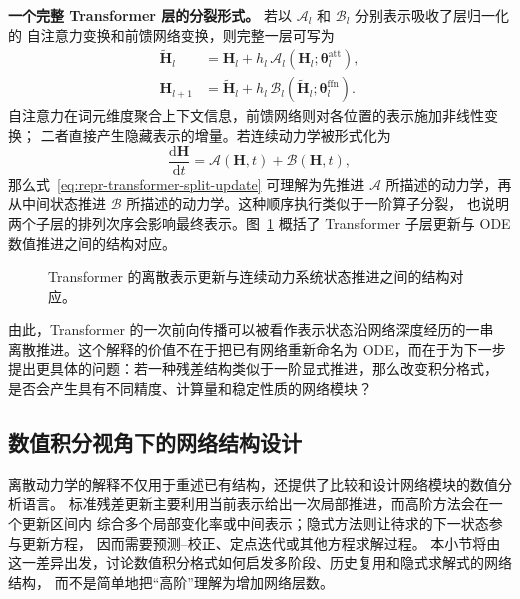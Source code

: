 \documentclass[UTF8,a4paper,zihao=-4,oneside,openany]{ctexbook}
\makeatletter
\newcommand{\AMLFigure}[2][0.96\linewidth]{%
  \begingroup
  \let\AtBeginDocument\@gobble
  \endgroup
}
\makeatother
\begin{document}
\textbf{一个完整 Transformer 层的分裂形式。}
若以 \(\mathcal{A}_l\) 和 \(\mathcal{B}_l\) 分别表示吸收了层归一化的
自注意力变换和前馈网络变换，则完整一层可写为
\begin{align}
    \widetilde{\boldsymbol{H}}_l
    &=
    \boldsymbol{H}_l
    +
    h_l\,
    \mathcal{A}_l(
        \boldsymbol{H}_l;
        \boldsymbol{\theta}^{\mathrm{att}}_l
    ),
    \nonumber\\
    \boldsymbol{H}_{l+1}
    &=
    \widetilde{\boldsymbol{H}}_l
    +
    h_l\,
    \mathcal{B}_l(
        \widetilde{\boldsymbol{H}}_l;
        \boldsymbol{\theta}^{\mathrm{ffn}}_l
    ).
    \label{eq:repr-transformer-split-update}
\end{align}
自注意力在词元维度聚合上下文信息，前馈网络则对各位置的表示施加非线性变换；
二者直接产生隐藏表示的增量。若连续动力学被形式化为
\[
    \frac{\mathrm{d}\boldsymbol{H}}{\mathrm{d}t}
    =
    \mathcal{A}(\boldsymbol{H},t)
    +
    \mathcal{B}(\boldsymbol{H},t),
\]
那么式~\eqref{eq:repr-transformer-split-update} 可理解为先推进
\(\mathcal{A}\) 所描述的动力学，再从中间状态推进
\(\mathcal{B}\) 所描述的动力学。这种顺序执行类似于一阶算子分裂，
也说明两个子层的排列次序会影响最终表示。图~\ref{fig:transformer-sublayer-as-ode-solver}
概括了 Transformer 子层更新与 ODE 数值推进之间的结构对应。

\begin{figure}[htbp]
    \centering
    \AMLFigure{figure-transformer-sublayer-as-ode-solver}
    \caption{Transformer 的离散表示更新与连续动力系统状态推进之间的结构对应。}
    \label{fig:transformer-sublayer-as-ode-solver}
\end{figure}

由此，Transformer 的一次前向传播可以被看作表示状态沿网络深度经历的一串
离散推进。这个解释的价值不在于把已有网络重新命名为 ODE，而在于为下一步
提出更具体的问题：若一种残差结构类似于一阶显式推进，那么改变积分格式，
是否会产生具有不同精度、计算量和稳定性质的网络模块？

\subsection{数值积分视角下的网络结构设计}

离散动力学的解释不仅用于重述已有结构，还提供了比较和设计网络模块的数值分析语言。
标准残差更新主要利用当前表示给出一次局部推进，而高阶方法会在一个更新区间内
综合多个局部变化率或中间表示；隐式方法则让待求的下一状态参与更新方程，
因而需要预测--校正、定点迭代或其他方程求解过程。
本小节将由这一差异出发，讨论数值积分格式如何启发多阶段、历史复用和隐式求解式的网络结构，
而不是简单地把“高阶”理解为增加网络层数。
\end{document}
